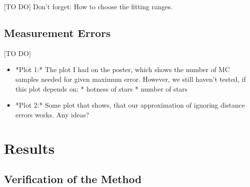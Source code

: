 \documentclass[12pt,preprint]{aastex}
\begin{document}
[TO DO] Don't forget: How to choose the fitting ranges.

\subsection{Measurement Errors}

[TO DO]

\begin{itemize}
\item *Plot 1:* The plot I had on the poster, which shows the number of MC samples needed for given maximum error. However, we still haven't tested, if this plot depends on: 
    * hotness of stars
    * number of stars
\item *Plot 2:* Some plot that shows, that our approximation of ignoring distance errors works. Any ideas?
\end{itemize}

\section{Results}

\subsection{Verification of the Method}
\end{document}

